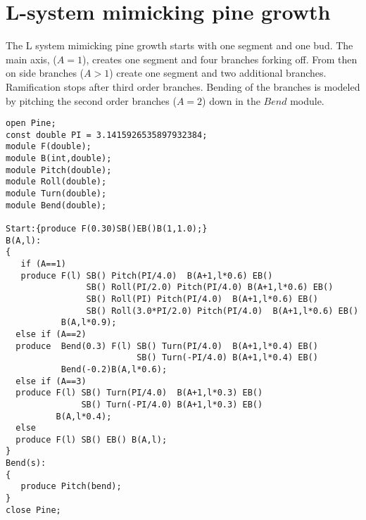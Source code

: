 \section{L-system mimicking pine growth}\label{sec:L1}
The L system  mimicking pine  growth starts with  one segment  and one
bud.  The main axis, ($A  = 1$),  creates one  segment and  four branches
forking off.  From then on side  branches ($A > 1$) create one segment
and  two additional  branches.  Ramification  stops after  third order
branches. Bending  of the branches  is modeled by pitching  the second
order branches ($A = 2$) down in the $Bend$ module.

\begin{verbatim}
open Pine;
const double PI = 3.1415926535897932384;
module F(double);
module B(int,double);
module Pitch(double);
module Roll(double);
module Turn(double);
module Bend(double);

Start:{produce F(0.30)SB()EB()B(1,1.0);}
B(A,l):
{
   if (A==1)
   produce F(l) SB() Pitch(PI/4.0)  B(A+1,l*0.6) EB() 
                SB() Roll(PI/2.0) Pitch(PI/4.0) B(A+1,l*0.6) EB()
                SB() Roll(PI) Pitch(PI/4.0)  B(A+1,l*0.6) EB() 
                SB() Roll(3.0*PI/2.0) Pitch(PI/4.0)  B(A+1,l*0.6) EB()
           B(A,l*0.9);
  else if (A==2)
  produce  Bend(0.3) F(l) SB() Turn(PI/4.0)  B(A+1,l*0.4) EB() 
                          SB() Turn(-PI/4.0) B(A+1,l*0.4) EB()
           Bend(-0.2)B(A,l*0.6);
  else if (A==3)
  produce F(l) SB() Turn(PI/4.0)  B(A+1,l*0.3) EB() 
               SB() Turn(-PI/4.0) B(A+1,l*0.3) EB()
          B(A,l*0.4);
  else
  produce F(l) SB() EB() B(A,l);
}
Bend(s):
{
   produce Pitch(bend);
}
close Pine;

\end{verbatim}
